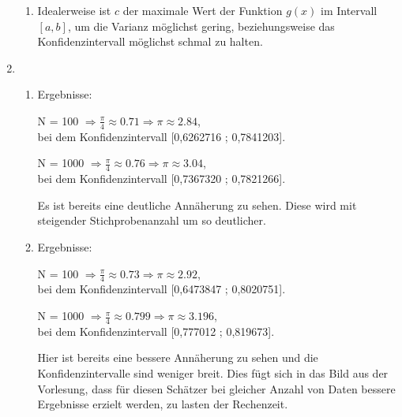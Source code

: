 \documentclass[a4paper]{scrartcl}
\def \blattnr {11}
\begin{document}
\begin{enumerate}[label=\bfseries \blattnr.\arabic*]
\begin{enumerate}
     \item %
	 Idealerweise ist $c$ der maximale Wert der Funktion $g(x)$ im Intervall 
	 $[a,b]$, um die Varianz möglichst gering, beziehungsweise das 
	 Konfidenzintervall möglichst schmal zu halten.
     
    \end{enumerate}
  \item %
    \begin{enumerate}
     \item %
         
         
         Ergebnisse:
         
         N = 100 $\Rightarrow \frac\pi4 \approx 0.71 \Rightarrow \pi \approx 2.84$, \\
         bei dem Konfidenzintervall [0,6262716 ; 0,7841203].
         
         N = 1000 $\Rightarrow \frac\pi4 \approx 0.76 \Rightarrow \pi \approx 3.04$, \\
         bei dem Konfidenzintervall [0,7367320 ; 0,7821266].
         
         Es ist bereits eine deutliche Annäherung zu sehen. Diese wird mit steigender 
         Stichprobenanzahl um so deutlicher.     
     \pagebreak
     \item %
	 
         
         Ergebnisse:
         
         N = 100 $\Rightarrow \frac\pi4 \approx 0.73 \Rightarrow \pi \approx 2.92$, \\
         bei dem Konfidenzintervall [0,6473847 ;  0,8020751].
         
         N = 1000 $\Rightarrow \frac\pi4 \approx 0.799 \Rightarrow \pi \approx 3.196$, \\
         bei dem Konfidenzintervall [0,777012 ; 0,819673].
         
         Hier ist bereits eine bessere Annäherung zu sehen und die Konfidenzintervalle 
         sind weniger breit. Dies fügt sich in das Bild aus der Vorlesung, dass für diesen 
         Schätzer bei gleicher Anzahl von Daten bessere Ergebnisse erzielt werden, zu lasten 
         der Rechenzeit.
    \end{enumerate}


\end{enumerate}
\end{document}

